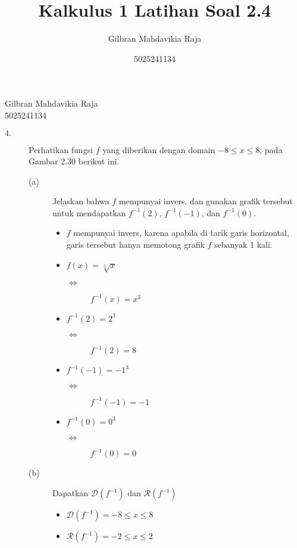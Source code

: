 \documentclass{article}
\title{Kalkulus 1 Latihan Soal 2.4}
\author{Gilbran Mahdavikia Raja}
\date{5025241134}
\begin{document}
\begin{flushleft}
    Gilbran Mahdavikia Raja \\
    5025241134 \\
\end{flushleft}
\begin{description}
    \item[$4.$] Perhatikan fungsi $f$ yang diberikan dengan domain $-8\leq x\leq8$, pada Gambar 2.30 berikut ini. 
    \begin{description}
        \item[(a)] Jelaskan bahwa $f$ mempunyai invers, dan gunakan grafik tersebut untuk mendapatkan $f^{-1}(2)$, $f^{-1}(-1)$, dan $f^{-1}(0)$.
        \begin{itemize}
            \item $f$ mempunyai invers, karena apabila di tarik garis horizontal, garis tersebut hanya memotong grafik $f$ sebanyak 1 kali.
            \item $f(x) = \sqrt[3]{x}$
            \begin{description}
                \item[$\Leftrightarrow$] $f^{-1}(x) = x^3$
            \end{description}
            \item $f^{-1}(2) = 2^3$
            \begin{description}
                \item[$\Leftrightarrow$] $f^{-1}(2) = 8$
            \end{description}
            \item $f^{-1}(-1) = -1^3$
            \begin{description}
                \item[$\Leftrightarrow$] $f^{-1}(-1) = -1$
            \end{description}
            \item $f^{-1}(0) = 0^3$
            \begin{description}
                \item[$\Leftrightarrow$] $f^{-1}(0) = 0$
            \end{description}
        \end{itemize}
        \item[(b)] Dapatkan $\mathcal{D}(f^{-1})$ dan $\mathcal{R}(f^{-1})$ 
        \begin{itemize}
            \item $\mathcal{D}(f^{-1}) = -8\leq x\leq8$
            \item $\mathcal{R}(f^{-1}) = -2\leq x\leq2$
        \end{itemize}
    \end{description}
\end{description}
\end{document}
